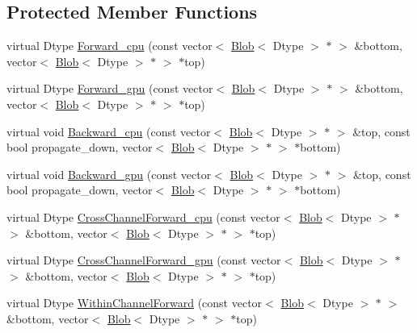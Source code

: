 \subsection*{Protected Member Functions}
\begin{DoxyCompactItemize}
\item 
virtual Dtype \hyperlink{classcaffe_1_1_l_r_n_layer_a825208caabbaa227d532a5c0d780e77c}{Forward\+\_\+cpu} (const vector$<$ \hyperlink{classcaffe_1_1_blob}{Blob}$<$ Dtype $>$ $\ast$ $>$ \&bottom, vector$<$ \hyperlink{classcaffe_1_1_blob}{Blob}$<$ Dtype $>$ $\ast$ $>$ $\ast$top)
\item 
virtual Dtype \hyperlink{classcaffe_1_1_l_r_n_layer_ae6bf5efc998c6cc22fdfd64bf2b245c4}{Forward\+\_\+gpu} (const vector$<$ \hyperlink{classcaffe_1_1_blob}{Blob}$<$ Dtype $>$ $\ast$ $>$ \&bottom, vector$<$ \hyperlink{classcaffe_1_1_blob}{Blob}$<$ Dtype $>$ $\ast$ $>$ $\ast$top)
\item 
virtual void \hyperlink{classcaffe_1_1_l_r_n_layer_a67a331a12eece60b04ff2960164b78fe}{Backward\+\_\+cpu} (const vector$<$ \hyperlink{classcaffe_1_1_blob}{Blob}$<$ Dtype $>$ $\ast$ $>$ \&top, const bool propagate\+\_\+down, vector$<$ \hyperlink{classcaffe_1_1_blob}{Blob}$<$ Dtype $>$ $\ast$ $>$ $\ast$bottom)
\item 
virtual void \hyperlink{classcaffe_1_1_l_r_n_layer_a37759b344e93a5d7f61caed89c1c8993}{Backward\+\_\+gpu} (const vector$<$ \hyperlink{classcaffe_1_1_blob}{Blob}$<$ Dtype $>$ $\ast$ $>$ \&top, const bool propagate\+\_\+down, vector$<$ \hyperlink{classcaffe_1_1_blob}{Blob}$<$ Dtype $>$ $\ast$ $>$ $\ast$bottom)
\item 
virtual Dtype \hyperlink{classcaffe_1_1_l_r_n_layer_aa4ede484dc14c32222fad968b7865522}{Cross\+Channel\+Forward\+\_\+cpu} (const vector$<$ \hyperlink{classcaffe_1_1_blob}{Blob}$<$ Dtype $>$ $\ast$ $>$ \&bottom, vector$<$ \hyperlink{classcaffe_1_1_blob}{Blob}$<$ Dtype $>$ $\ast$ $>$ $\ast$top)
\item 
virtual Dtype \hyperlink{classcaffe_1_1_l_r_n_layer_ad6cd5df675d0975034e58c9e09304e33}{Cross\+Channel\+Forward\+\_\+gpu} (const vector$<$ \hyperlink{classcaffe_1_1_blob}{Blob}$<$ Dtype $>$ $\ast$ $>$ \&bottom, vector$<$ \hyperlink{classcaffe_1_1_blob}{Blob}$<$ Dtype $>$ $\ast$ $>$ $\ast$top)
\item 
virtual Dtype \hyperlink{classcaffe_1_1_l_r_n_layer_a6f86e75a6b68f47e9e528644254057c2}{Within\+Channel\+Forward} (const vector$<$ \hyperlink{classcaffe_1_1_blob}{Blob}$<$ Dtype $>$ $\ast$ $>$ \&bottom, vector$<$ \hyperlink{classcaffe_1_1_blob}{Blob}$<$ Dtype $>$ $\ast$ $>$ $\ast$top)

\end{DoxyCompactItemize}
